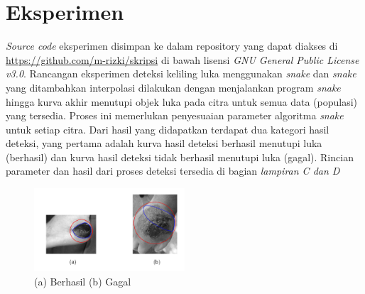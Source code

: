 \section{Eksperimen}
\emph{Source code} eksperimen disimpan ke dalam repository yang dapat diakses di \url{https://github.com/m-rizki/skripsi} di bawah lisensi \emph{GNU General Public License v3.0}. Rancangan eksperimen deteksi keliling luka menggunakan \emph{snake} dan \emph{snake} yang ditambahkan interpolasi dilakukan dengan menjalankan program \emph{snake} hingga kurva akhir menutupi objek luka pada citra untuk semua data (populasi) yang tersedia. Proses ini memerlukan penyesuaian parameter algoritma \emph{snake} untuk setiap citra. Dari hasil yang didapatkan terdapat dua kategori hasil deteksi, yang pertama adalah kurva hasil deteksi berhasil menutupi luka (berhasil) dan kurva hasil deteksi tidak berhasil menutupi luka (gagal). Rincian parameter dan hasil dari proses deteksi tersedia di bagian \emph{lampiran C dan D}
\begin{figure}[H]
	\centering
	\includegraphics[width=0.5\textwidth]{gambar/result_good_bad}
	\caption{(a) Berhasil (b) Gagal}
	\label{Gambar:result_good_bad}
\end{figure}

